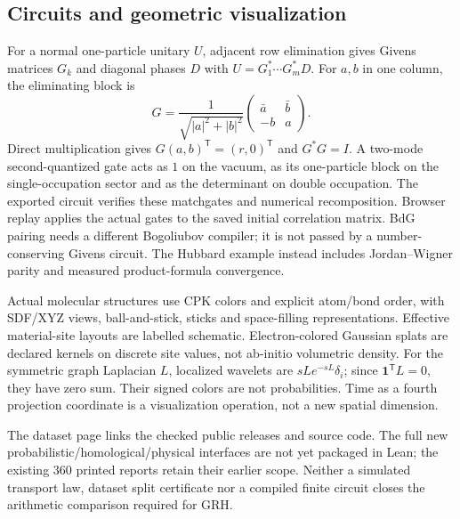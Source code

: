 \documentclass[11pt,oneside,openany]{book}
\theoremstyle{definition}\newtheorem{definition}[theorem]{Definition}
\theoremstyle{remark}\newtheorem{remark}[theorem]{Remark}
\begin{document}
\subsection{Circuits and geometric visualization}
For a normal one-particle unitary $U$, adjacent row elimination gives Givens
matrices $G_k$ and diagonal phases $D$ with
$U=G_1^*\cdots G_m^*D$. For $a,b$ in one column, the eliminating block is
\[
 G=\frac1{\sqrt{|a|^2+|b|^2}}
 \begin{pmatrix}\bar a&\bar b\\-b&a\end{pmatrix}.
\]
Direct multiplication gives $G(a,b)^{\mathsf T}=(r,0)^{\mathsf T}$ and
$G^*G=I$. A two-mode second-quantized gate acts as $1$ on the vacuum, as its
one-particle block on the single-occupation sector and as the determinant on
double occupation. The exported circuit verifies these matchgates and numerical
recomposition. Browser replay applies the actual gates to the saved initial
correlation matrix. BdG pairing needs a different Bogoliubov compiler; it is
not passed by a number-conserving Givens circuit. The Hubbard example instead
includes Jordan--Wigner parity and measured product-formula convergence.

Actual molecular structures use CPK colors and explicit atom/bond order, with
SDF/XYZ views, ball-and-stick, sticks and space-filling representations.
Effective material-site layouts are labelled schematic. Electron-colored
Gaussian splats are declared kernels on discrete site values, not ab-initio
volumetric density. For the symmetric graph Laplacian $L$, localized wavelets
are $sLe^{-sL}\delta_i$; since $\mathbf1^{\mathsf T}L=0$, they have zero sum.
Their signed colors are not probabilities. Time as a fourth projection
coordinate is a visualization operation, not a new spatial dimension.

The dataset page links the checked public releases and source code. The full
new probabilistic/homological/physical interfaces are not yet packaged in Lean;
the existing $360$ printed reports retain their earlier scope. Neither a simulated
transport law, dataset split certificate nor a compiled finite circuit closes
the arithmetic comparison required for GRH.
\end{document}
